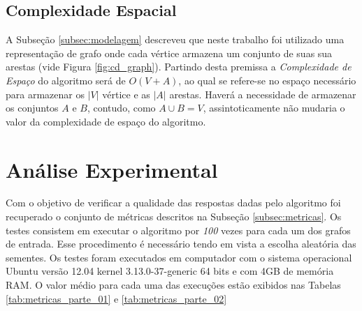 \documentclass[12pt]{article}
\begin{document}
\subsection{Complexidade Espacial}
\label{subsec:complex_espacial}

A Subseção \ref{subsec:modelagem} descreveu que neste trabalho foi utilizado uma representação de grafo onde cada vértice armazena um conjunto de suas sua arestas (vide Figura \ref{fig:cd_graph}). Partindo desta premissa a \textit{Complexidade de Espaço} do algoritmo será de $O(V+A)$, ao qual se refere-se no espaço necessário para armazenar os $|V|$ vértice e as $|A|$ arestas. Haverá a necessidade de armazenar os conjuntos $A$ e $B$, contudo, como $ A \cup B = V$, assintoticamente não mudaria o valor da complexidade de espaço do algoritmo.	

\section{Análise Experimental}
\label{sec:experimentos}

Com o objetivo de verificar a qualidade das respostas dadas pelo algoritmo foi recuperado o conjunto de métricas descritos na Subseção \ref{subsec:metricas}. Os testes consistem em executar o algoritmo por \textit{100} vezes para cada um dos grafos de entrada. Esse procedimento é necessário tendo em vista a escolha aleatória das sementes. Os testes foram executados em computador com o sistema operacional Ubuntu versão 12.04 kernel 3.13.0-37-generic 64 bits e com 4GB de memória RAM. O valor médio para cada uma das execuções estão exibidos nas Tabelas \ref{tab:metricas_parte_01}{} e \ref{tab:metricas_parte_02}{}

\begin{table}[h]
\centering
{}
\caption{Métricas Grafos A e B - Parte 01/02}
\label{tab:metricas_parte_01}
\end{table}
\end{document}
